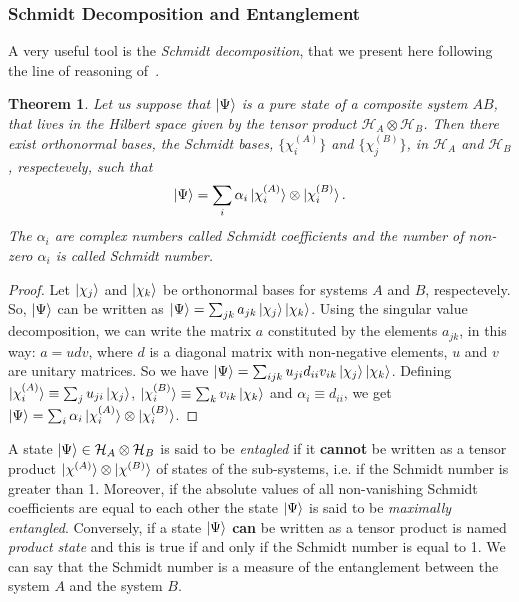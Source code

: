 \subsubsection{Schmidt Decomposition and Entanglement}
A very useful tool is the \emph{Schmidt decomposition}, that we present here following the line of reasoning of~\cite{nielsen_chuang}.
\newtheorem{theo}{Theorem}[section]
\begin{theo}
    Let us suppose that $\ket{\Psi}$ is a pure state of a composite system $AB$, that lives in the Hilbert space given by the tensor product $\mathcal{H}_A \otimes \mathcal{H}_B$. Then there exist orthonormal bases, the Schmidt bases, $\{\chi_i^{(A)}\}$ and $\{\chi_j^{(B)}\}$, in $\mathcal{H}_A$ and $\mathcal{H}_B$, respectevely, such that
    \begin{equation}
        \ket{\Psi} = \sum_i \alpha_i \ket{\chi_i^{(A)}}\otimes \ket{\chi_i^{(B)}}.
    \end{equation}
    The $\alpha_i$ are complex numbers called Schmidt coefficients and the number of non-zero $\alpha_i$ is called Schmidt number.
\end{theo}
\begin{proof}
Let $\ket{\chi_j}$ and $\ket{\chi_k}$ be orthonormal bases for systems $A$ and $B$, respectevely. So, $\ket{\Psi}$ can be written as $\ket{\Psi} = \sum_{jk} a_{jk}\ket{\chi_j}\ket{\chi_k}$. Using the singular value decomposition, we can write the matrix $a$ constituted by the elements $a_{jk}$, in this way: $a = udv$, where $d$ is a diagonal matrix with non-negative elements, $u$ and $v$ are unitary matrices. So we have $\ket{\Psi} = \sum_{ijk} u_{ji}d_{ii}v_{ik} \ket{\chi_j}\ket{\chi_k}$.
Defining $\ket{\chi_i^{(A)}} \equiv \sum_j u_{ji}\ket{\chi_j}$, $\ket{\chi_i^{(B)}} \equiv \sum_k v_{ik}\ket{\chi_k}$ and $\alpha_i \equiv d_{ii}$, we get $\ket{\Psi} = \sum_i \alpha_i \ket{\chi_i^{(A)}}\otimes \ket{\chi_i^{(B)}}$.
\end{proof}

A state $\ket{\Psi} \in \mathcal{H}_A \otimes \mathcal{H}_B$ is said to be \emph{entagled} if it \textbf{cannot} be written as a tensor product $\ket{\chi^{(A)}}\otimes \ket{\chi^{(B)}}$ of states of the sub-systems, i.e. if the Schmidt number is greater than 1. Moreover, if the absolute values of all non-vanishing Schmidt coefficients are equal to each other the state $\ket{\Psi}$ is said to be \emph{maximally entangled}. Conversely, if a state $\ket{\Psi}$ \textbf{can} be written as a tensor product is named \emph{product state} and this is true if and only if the Schmidt number is equal to 1. We can say that the Schmidt number is a measure of the entanglement between the system $A$ and the system $B$.

